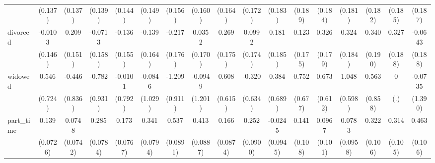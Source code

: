 {\begin{tabular}{l*{16}{c}}
                    &     (0.137)         &     (0.137)         &     (0.139)         &     (0.144)         &     (0.149)         &     (0.156)         &     (0.160)         &     (0.164)         &     (0.172)         &     (0.183)         &     (0.189)         &     (0.184)         &     (0.181)         &     (0.182)         &     (0.185)         &     (0.187)         \\
[1em]
divorced            &     -0.0103         &       0.209         &     -0.0713         &      -0.136         &      -0.139         &      -0.217         &      0.0352         &       0.269         &      0.0992         &       0.181         &       0.123         &       0.326         &       0.324         &       0.340         &       0.327         &     -0.0643         \\
                    &     (0.146)         &     (0.151)         &     (0.158)         &     (0.155)         &     (0.164)         &     (0.176)         &     (0.170)         &     (0.175)         &     (0.174)         &     (0.185)         &     (0.175)         &     (0.179)         &     (0.184)         &     (0.190)         &     (0.188)         &     (0.188)         \\
[1em]
widowed             &       0.546         &      -0.446         &      -0.782         &     -0.0101         &     -0.0846         &      -1.209         &     -0.0949         &       0.608         &      -0.320         &       0.384         &       0.752         &       0.673         &       1.048         &       0.563         &           0         &     -0.0735         \\
                    &     (0.724)         &     (0.836)         &     (0.931)         &     (0.792)         &     (1.029)         &     (0.911)         &     (1.201)         &     (0.615)         &     (0.634)         &     (0.689)         &     (0.677)         &     (0.612)         &     (0.598)         &     (0.858)         &         (.)         &     (1.390)         \\
[1em]
part\_time           &       0.139         &      0.0748         &       0.285\sym{***}&       0.173\sym{*}  &       0.341\sym{***}&       0.537\sym{***}&       0.413\sym{***}&       0.166         &       0.252\sym{**} &     -0.0245         &       0.141         &      0.0967         &      0.0783         &       0.322\sym{**} &       0.314\sym{**} &       0.463\sym{***}\\
                    &    (0.0726)         &    (0.0742)         &    (0.0784)         &    (0.0767)         &    (0.0794)         &    (0.0891)         &    (0.0887)         &    (0.0874)         &    (0.0900)         &    (0.0945)         &     (0.108)         &     (0.101)         &    (0.0958)         &     (0.106)         &     (0.105)         &     (0.106)         \\

\end{tabular}}
